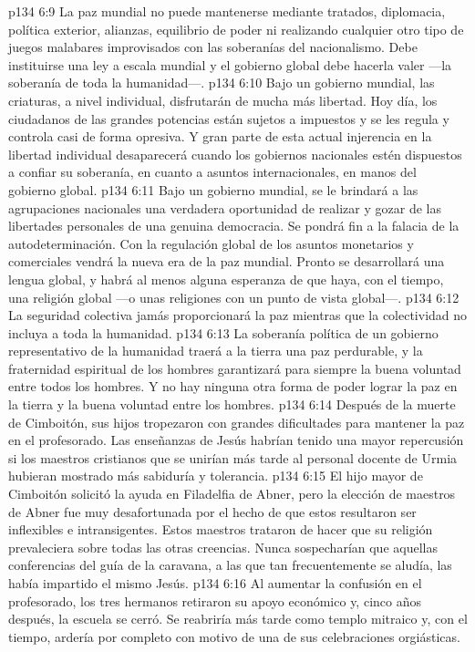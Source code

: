 \vs p134 6:9 La paz mundial no puede mantenerse mediante tratados, diplomacia, política exterior, alianzas, equilibrio de poder ni realizando cualquier otro tipo de juegos malabares improvisados con las soberanías del nacionalismo. Debe instituirse una ley a escala mundial y el gobierno global debe hacerla valer ---la soberanía de toda la humanidad---.
\vs p134 6:10 Bajo un gobierno mundial, las criaturas, a nivel individual, disfrutarán de mucha más libertad. Hoy día, los ciudadanos de las grandes potencias están sujetos a impuestos y se les regula y controla casi de forma opresiva. Y gran parte de esta actual injerencia en la libertad individual desaparecerá cuando los gobiernos nacionales estén dispuestos a confiar su soberanía, en cuanto a asuntos internacionales, en manos del gobierno global.
\vs p134 6:11 Bajo un gobierno mundial, se le brindará a las agrupaciones nacionales una verdadera oportunidad de realizar y gozar de las libertades personales de una genuina democracia. Se pondrá fin a la falacia de la autodeterminación. Con la regulación global de los asuntos monetarios y comerciales vendrá la nueva era de la paz mundial. Pronto se desarrollará una lengua global, y habrá al menos alguna esperanza de que haya, con el tiempo, una religión global ---o unas religiones con un punto de vista global---.
\vs p134 6:12 La seguridad colectiva jamás proporcionará la paz mientras que la colectividad no incluya a toda la humanidad.
\vs p134 6:13 La soberanía política de un gobierno representativo de la humanidad traerá a la tierra una paz perdurable, y la fraternidad espiritual de los hombres garantizará para siempre la buena voluntad entre todos los hombres. Y no hay ninguna otra forma de poder lograr la paz en la tierra y la buena voluntad entre los hombres.
\separatorline
\vs p134 6:14 Después de la muerte de Cimboitón, sus hijos tropezaron con grandes dificultades para mantener la paz en el profesorado. Las enseñanzas de Jesús habrían tenido una mayor repercusión si los maestros cristianos que se unirían más tarde al personal docente de Urmia hubieran mostrado más sabiduría y tolerancia.
\vs p134 6:15 El hijo mayor de Cimboitón solicitó la ayuda en Filadelfia de Abner, pero la elección de maestros de Abner fue muy desafortunada por el hecho de que estos resultaron ser inflexibles e intransigentes. Estos maestros trataron de hacer que su religión prevaleciera sobre todas las otras creencias. Nunca sospecharían que aquellas conferencias del guía de la caravana, a las que tan frecuentemente se aludía, las había impartido el mismo Jesús.
\vs p134 6:16 Al aumentar la confusión en el profesorado, los tres hermanos retiraron su apoyo económico y, cinco años después, la escuela se cerró. Se reabriría más tarde como templo mitraico y, con el tiempo, ardería por completo con motivo de una de sus celebraciones orgiásticas.
